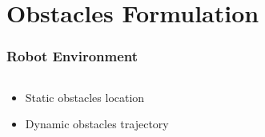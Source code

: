 \section{Obstacles Formulation}

	\begin{frame}
		\frametitle{Robot Environment}
		\begin{columns}[T]
			\begin{column}{0.3\textwidth}
				\begin{itemize}
					\item Static obstacles location \\[1.0cm]
					\item Dynamic obstacles trajectory
				\end{itemize}
			\end{column}
			\begin{column}{0.7\textwidth}
				\centering
			\end{column}
		\end{columns}
	\end{frame}

